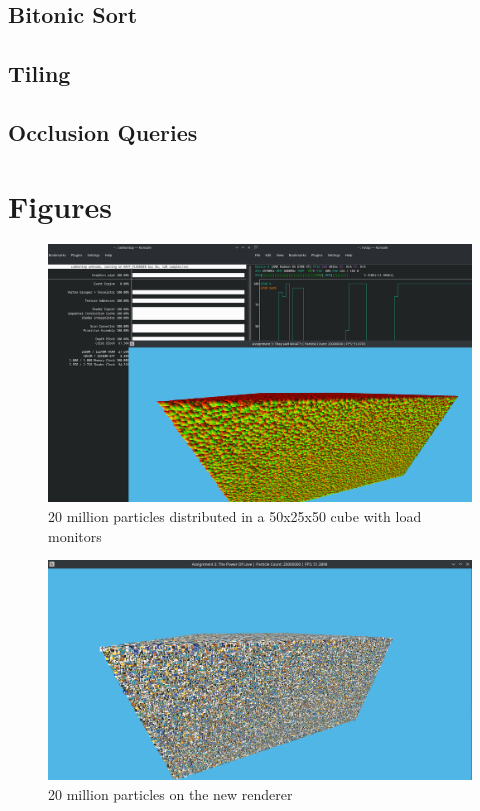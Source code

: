 \documentclass[]{report}
\begin{document}
\subsection{Bitonic Sort}
\subsection{Tiling}
\subsection{Occlusion Queries}

\section{Figures}
\begin{figure}[H]
	\centerline{\includegraphics[width=1.6\linewidth]{screenshot002}}
	\caption[]{20 million particles distributed in a 50x25x50 cube with load monitors}
	\label{fig:screenshot002}
\end{figure}

\begin{figure}[H]
	\centerline{\includegraphics[width=1.6\linewidth]{screenshot003}}
	\caption{20 million particles on the new renderer}
	\label{fig:newrender}
\end{figure}
\end{document}
